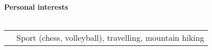 \textbf{Personal interests}
\\
\\
\begin{tabular}{p{}|p{}}
&Sport (chess, volleyball), travelling, mountain hiking\\
\end{tabular}